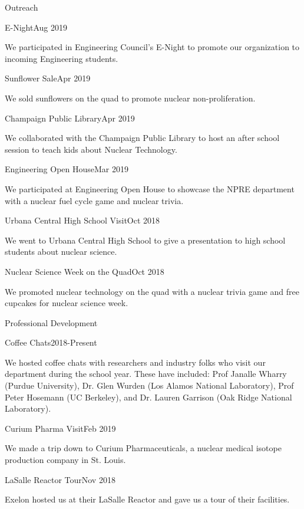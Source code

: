 \documentclass{resume2} %
\begin{document}
\begin{rSection}{Outreach}
	\begin{rSubsection}{E-Night}{Aug 2019}{}{}
		\item We participated in Engineering Council's E-Night to promote our 
		organization to incoming Engineering students.  
	\end{rSubsection}
	\begin{rSubsection}{Sunflower Sale}{Apr 2019}{}{}
		\item We sold sunflowers on the quad to promote nuclear non-proliferation. 
	\end{rSubsection}
	\begin{rSubsection}{Champaign Public Library}{Apr 2019}{}{}
		\item We collaborated with the Champaign Public Library to host
		an after school session to teach kids about Nuclear Technology. 
	\end{rSubsection}
	\begin{rSubsection}{Engineering Open House}{Mar 2019}{}{}
		\item We participated at Engineering Open House to showcase 
		the NPRE department with a nuclear fuel cycle game and nuclear trivia. 
	\end{rSubsection}
	\begin{rSubsection}{Urbana Central High School Visit}{Oct 2018}{}{}
		\item We went to Urbana Central High School to give a presentation 
		to high school students about nuclear science. 
	\end{rSubsection}
	\begin{rSubsection}{Nuclear Science Week on the Quad}{Oct 2018}{}{}
		\item We promoted nuclear technology on the quad with a
		nuclear trivia game and free cupcakes for nuclear science week.
	\end{rSubsection}
\end{rSection}

\begin{rSection}{Professional Development}
	\begin{rSubsection}{Coffee Chats}{2018-Present}{}{}
		\item We hosted coffee chats with researchers and industry folks who 
		visit our department during the school year. These have included: 
		Prof Janalle Wharry (Purdue University), 
		Dr. Glen Wurden (Los Alamos National Laboratory), 
		Prof Peter Hosemann (UC Berkeley), 
		and Dr. Lauren Garrison (Oak Ridge National Laboratory). 
	\end{rSubsection}
	\begin{rSubsection}{Curium Pharma Visit}{Feb 2019}{}{}
		\item We made a trip down to Curium Pharmaceuticals, 
		a nuclear medical isotope production company in St. Louis.
	\end{rSubsection}
	\begin{rSubsection}{LaSalle Reactor Tour}{Nov 2018}{}{}
		\item Exelon hosted us at their LaSalle Reactor and gave us a 
		tour of their facilities. 
	\end{rSubsection}
\end{rSection}


\end{document}
